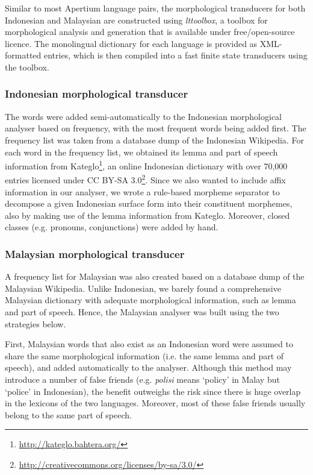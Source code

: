 \documentclass[10pt,a5paper,twoside]{article}
\begin{document}
Similar to most Apertium language pairs, the morphological transducers for both Indonesian and Malaysian are constructed using \emph{lttoolbox}, a toolbox for morphological analysis and generation that is available under free/open-source licence. The monolingual dictionary for each language is provided as XML-formatted entries, which is then compiled into a fast finite state transducers using the toolbox.

\subsubsection{Indonesian morphological transducer}
The words were added semi-automatically to the Indonesian morphological analyser based on frequency, with the most frequent words being added first. The frequency list was taken from a database dump of the Indonesian Wikipedia. For each word in the frequency list, we obtained its lemma and part of speech information from Kateglo\footnote{\url{http://kateglo.bahtera.org/}}, an online Indonesian dictionary with over 70,000 entries licensed under CC BY-SA 3.0\footnote{\url{http://creativecommons.org/licenses/by-sa/3.0/}}. Since we also wanted to include affix information in our analyser, we wrote a rule-based morpheme separator to decompose a given Indonesian surface form into their constituent morphemes, also by making use of the lemma information from Kateglo. Moreover, closed classes (e.g. pronouns, conjunctions) were added by hand.

\subsubsection{Malaysian morphological transducer}
A frequency list for Malaysian was also created based on a database dump of the Malaysian Wikipedia. Unlike Indonesian, we barely found a comprehensive Malaysian dictionary with adequate morphological information, such as lemma and part of speech. Hence, the Malaysian analyser was built using the two strategies below.

First, Malaysian words that also exist as an Indonesian word were assumed to share the same morphological information (i.e. the same lemma and part of speech), and added automatically to the analyser. Although this method may introduce a number of false friends (e.g. \emph{polisi} means `policy' in Malay but `police' in Indonesian), the benefit outweighs the risk since there is huge overlap in the lexicons of the two languages. Moreover, most of these false friends usually belong to the same part of speech.
\end{document}
